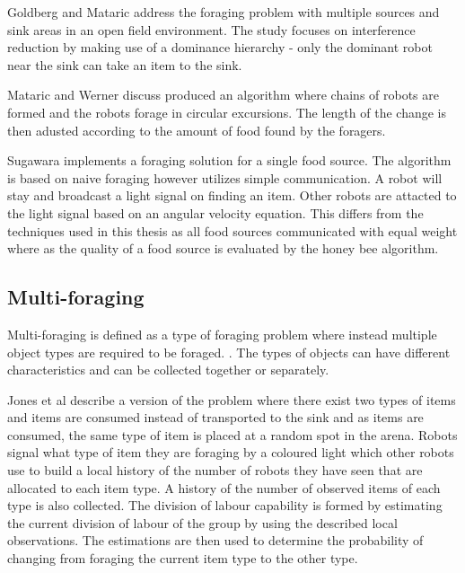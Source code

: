 Goldberg and Mataric \cite{Goldberg01designand} address the foraging problem with multiple sources and sink areas in an open field environment. The study focuses on interference reduction by making use of a dominance hierarchy - only the dominant robot near the sink can take an item to the sink. %

Mataric \cite{werger1996robotic} and Werner discuss produced an algorithm where chains of robots are formed and the robots forage in circular excursions. The length of the change is then adusted according to the amount of food found by the foragers. %
 
Sugawara \cite{sugawara2002swarming} implements a foraging solution for a single food source. The algorithm is based on naive foraging however utilizes simple communication. A robot will stay and broadcast a light signal on finding an item. Other robots are attacted to the light signal based on an angular velocity equation. This differs from the techniques used in this thesis as all food sources communicated with equal weight where as the quality of a food source is evaluated by the honey bee algorithm.

\subsection{Multi-foraging}
Multi-foraging is defined as a type of foraging problem where instead  multiple object types are required to be foraged. \cite{Balch99rewardand}. The types of objects can have different characteristics and can be collected together or separately.

Jones et al \cite{jones2003adaptive} describe a version of the problem where there exist two types of items and items are consumed instead of transported to the sink and as items are consumed, the same type of item is placed at a random spot in the arena. Robots signal what type of item they are foraging by a coloured light which other robots use to build a local history of the number of robots they have seen that are allocated to each item type. A history of the number of observed items of each type is also collected. The division of labour capability is formed by estimating the current division of labour of the group by  using the described local observations. The estimations are then used to determine the probability of changing from foraging the current item type to the other type. 

